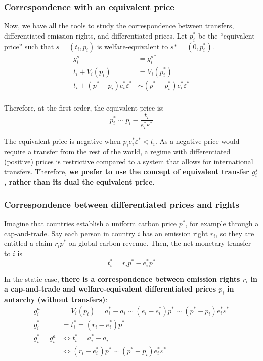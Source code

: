 \documentclass[12pt,english]{article}
\begin{document}
\subsubsection*{Correspondence with an equivalent
price}\label{correspondence-with-an-equivalent-price}

Now, we have all the tools to study the correspondence between transfers, differentiated emission rights, and differentiated prices.
Let $p^*_i$ be the ``equivalent price'' such that $s=(t_i, p_i)$ is welfare-equivalent to $s*=(0, p^*_i)$. $$\begin{aligned}
g^s_i &= g^{s*}_i \\
t_i + V_i(p_i) &= V_i(p^*_i) \\
t_i + (p^* - p_i) e^*_i  \varepsilon^* &\sim (p^* - p^*_i) e^*_i  \varepsilon^* \\
\end{aligned}$$

Therefore, at the first order, the equivalent price is:
$$p^*_i \sim p_i - \frac{t_i}{e^*_i  \varepsilon^* } $$

The equivalent price is negative when $p_i e^*_i  \varepsilon^* < t_i$. As a negative price would require a transfer from the rest of the world, a regime with differentiated (positive) prices is restrictive compared to a system that allows for international transfers. Therefore, \textbf{we prefer to use the concept of equivalent transfer $g^s_i$, rather than its dual the equivalent price}. 


\subsubsection*{Correspondence between differentiated prices and
rights}\label{correspondence-between-differentiated-prices-and-rights}

Imagine that countries establish a uniform carbon price $p^*$, for example through a cap-and-trade. Say each person in country $i$ has an emission right $r_i$, so they are entitled a claim $r_i p^*$ on global carbon revenue. Then, the net monetary transfer to $i$ is $$t^*_i = r_i p^* - e^*_i p^*$$

In the static case, \textbf{there is a correspondence between emission
rights $r_i$ in a cap-and-trade and welfare-equivalent differentiated prices $p_i$ in
autarchy (without transfers)}: $$\begin{aligned}
g^a_i &= V_i(p_i) = a^*_i - a_i \sim (e_i - e^*_i) p^* \sim (p^* - p_i) e^*_i  \varepsilon^* \\
g^*_i &= t^*_i = (r_i - e^*_i) p^* \\
g^*_i = g^a_i &\Leftrightarrow t^*_i = a^*_i - a_i \\
&\Leftrightarrow (r_i - e^*_i) p^* \sim (p^* - p_i) e^*_i  \varepsilon^*
\end{aligned}$$
\end{document}
